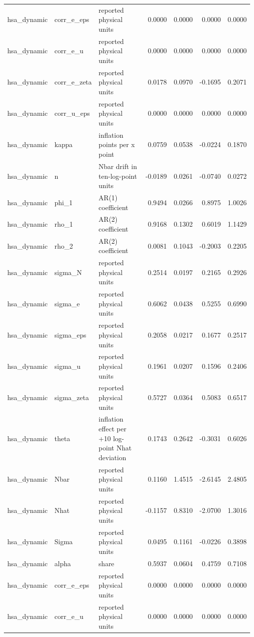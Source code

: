 \begin{tabular}{lllrrrr}
hsa\_dynamic & corr\_e\_eps & reported physical units & 0.0000 & 0.0000 & 0.0000 & 0.0000 \\
hsa\_dynamic & corr\_e\_u & reported physical units & 0.0000 & 0.0000 & 0.0000 & 0.0000 \\
hsa\_dynamic & corr\_e\_zeta & reported physical units & 0.0178 & 0.0970 & -0.1695 & 0.2071 \\
hsa\_dynamic & corr\_u\_eps & reported physical units & 0.0000 & 0.0000 & 0.0000 & 0.0000 \\
hsa\_dynamic & kappa & inflation points per x point & 0.0759 & 0.0538 & -0.0224 & 0.1870 \\
hsa\_dynamic & n & Nbar drift in ten-log-point units & -0.0189 & 0.0261 & -0.0740 & 0.0272 \\
hsa\_dynamic & phi\_1 & AR(1) coefficient & 0.9494 & 0.0266 & 0.8975 & 1.0026 \\
hsa\_dynamic & rho\_1 & AR(2) coefficient & 0.9168 & 0.1302 & 0.6019 & 1.1429 \\
hsa\_dynamic & rho\_2 & AR(2) coefficient & 0.0081 & 0.1043 & -0.2003 & 0.2205 \\
hsa\_dynamic & sigma\_N & reported physical units & 0.2514 & 0.0197 & 0.2165 & 0.2926 \\
hsa\_dynamic & sigma\_e & reported physical units & 0.6062 & 0.0438 & 0.5255 & 0.6990 \\
hsa\_dynamic & sigma\_eps & reported physical units & 0.2058 & 0.0217 & 0.1677 & 0.2517 \\
hsa\_dynamic & sigma\_u & reported physical units & 0.1961 & 0.0207 & 0.1596 & 0.2406 \\
hsa\_dynamic & sigma\_zeta & reported physical units & 0.5727 & 0.0364 & 0.5083 & 0.6517 \\
hsa\_dynamic & theta & inflation effect per +10 log-point Nhat deviation & 0.1743 & 0.2642 & -0.3031 & 0.6026 \\
hsa\_dynamic & Nbar & reported physical units & 0.1160 & 1.4515 & -2.6145 & 2.4805 \\
hsa\_dynamic & Nhat & reported physical units & -0.1157 & 0.8310 & -2.0700 & 1.3016 \\
hsa\_dynamic & Sigma & reported physical units & 0.0495 & 0.1161 & -0.0226 & 0.3898 \\
hsa\_dynamic & alpha & share & 0.5937 & 0.0604 & 0.4759 & 0.7108 \\
hsa\_dynamic & corr\_e\_eps & reported physical units & 0.0000 & 0.0000 & 0.0000 & 0.0000 \\
hsa\_dynamic & corr\_e\_u & reported physical units & 0.0000 & 0.0000 & 0.0000 & 0.0000 \\

\end{tabular}
